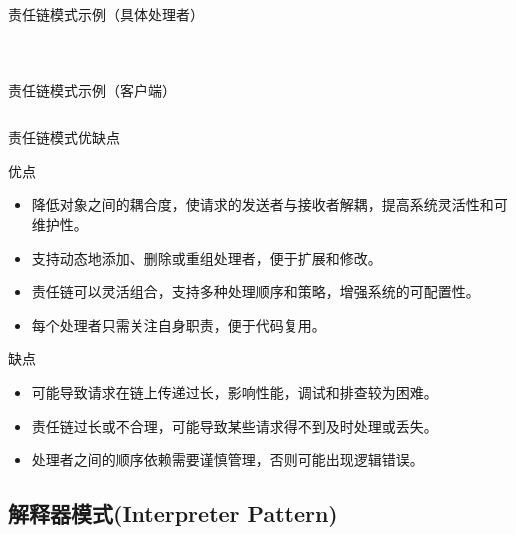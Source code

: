 \documentclass[UTF8,aspectratio=169]{beamer}
\begin{document}
\begin{frame}{责任链模式示例（具体处理者）}
    \begin{columns}
        \begin{column}{0.48\textwidth}
            \inputminted[firstline=64, lastline=76]{cpp}{code/chain_of_responsibility_pattern.cpp}
        \end{column}
        \begin{column}{0.48\textwidth}
            \inputminted[firstline=78, lastline=87]{cpp}{code/chain_of_responsibility_pattern.cpp}
        \end{column}
    \end{columns}
\end{frame}

\begin{frame}{责任链模式示例（客户端）}
    \inputminted[firstline=96, lastline=115]{cpp}{code/chain_of_responsibility_pattern.cpp}
\end{frame}

\begin{frame}{责任链模式优缺点}
    \begin{ytublock}{优点}
        \begin{itemize}
            \item 降低对象之间的耦合度，使请求的发送者与接收者解耦，提高系统灵活性和可维护性。
            \item 支持动态地添加、删除或重组处理者，便于扩展和修改。
            \item 责任链可以灵活组合，支持多种处理顺序和策略，增强系统的可配置性。
            \item 每个处理者只需关注自身职责，便于代码复用。
        \end{itemize}
    \end{ytublock}
    \begin{alertytublock}{缺点}
        \begin{itemize}
            \item 可能导致请求在链上传递过长，影响性能，调试和排查较为困难。
            \item 责任链过长或不合理，可能导致某些请求得不到及时处理或丢失。
            \item 处理者之间的顺序依赖需要谨慎管理，否则可能出现逻辑错误。
        \end{itemize}
    \end{alertytublock}
\end{frame}

\subsection{解释器模式(Interpreter Pattern)}
\end{document}
